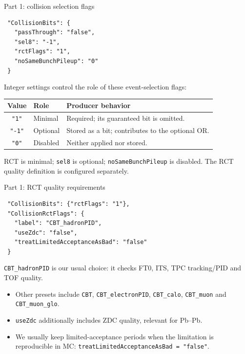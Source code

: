 \begin{frame}[fragile]{Part 1: collision selection flags}
 \begin{lstlisting}
 "CollisionBits": {
   "passThrough": "false",
   "sel8": "-1",
   "rctFlags": "1",
   "noSameBunchPileup": "0"
 }
 \end{lstlisting}
 \small Integer settings control the role of these event-selection flags:
 \par\medskip
 \renewcommand{\arraystretch}{1.2}
 \begin{tabular}{cll}
 \toprule
 Value & Role & Producer behavior\\
 \midrule
 \texttt{"1"} & Minimal & Required; its guaranteed bit is omitted.\\
 \texttt{"-1"} & Optional & Stored as a bit; contributes to the optional OR.\\
 \texttt{"0"} & Disabled & Neither applied nor stored.\\
 \bottomrule
 \end{tabular}
 \par\medskip
 \small RCT is minimal; \texttt{sel8} is optional; \texttt{noSameBunchPileup} is disabled. The RCT quality definition is configured separately.
\end{frame}

\begin{frame}[fragile]{Part 1: RCT quality requirements}
 \begin{lstlisting}
 "CollisionBits": {"rctFlags": "1"},
 "CollisionRctFlags": {
   "label": "CBT_hadronPID",
   "useZdc": "false",
   "treatLimitedAcceptanceAsBad": "false"
 }
 \end{lstlisting}
 \small \texttt{CBT\_hadronPID} is our usual choice: it checks FT0, ITS, TPC tracking/PID and TOF quality.
 \begin{itemize}
 \item Other presets include \texttt{CBT}, \texttt{CBT\_electronPID}, \texttt{CBT\_calo}, \texttt{CBT\_muon} and \texttt{CBT\_muon\_glo}.
 \item \texttt{useZdc} additionally includes ZDC quality, relevant for Pb--Pb.
 \item We usually keep limited-acceptance periods when the limitation is reproducible in MC: \texttt{treatLimitedAcceptanceAsBad = "false"}.
 \end{itemize}
\end{frame}

